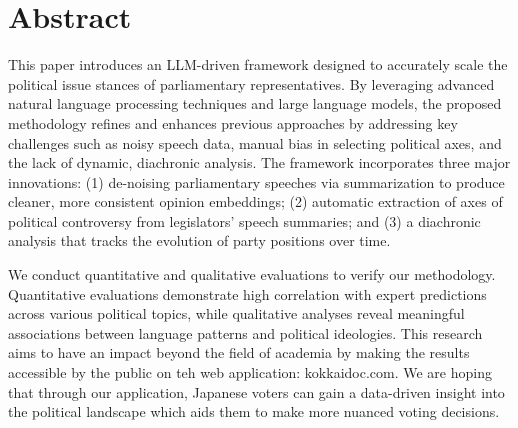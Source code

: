 \documentclass[final,5p,times,twocolumn,authoryear]{elsarticle}
\begin{document}






\onecolumn

\twocolumn
{}

\section{Abstract}
This paper introduces an LLM-driven framework designed to accurately scale the political issue stances of parliamentary representatives. By leveraging advanced natural language processing techniques and large language models, the proposed methodology refines and enhances previous approaches by addressing key challenges such as noisy speech data, manual bias in selecting political axes, and the lack of dynamic, diachronic analysis. The framework incorporates three major innovations: (1) de-noising parliamentary speeches via summarization to produce cleaner, more consistent opinion embeddings; (2) automatic extraction of axes of political controversy from legislators’ speech summaries; and (3) a diachronic analysis that tracks the evolution of party positions over time.

We conduct quantitative and qualitative evaluations to verify our methodology. Quantitative evaluations demonstrate high correlation with expert predictions across various political topics, while qualitative analyses reveal meaningful associations between language patterns and political ideologies. This research aims to have an impact beyond the field of academia by making the results accessible by the public on teh web application: kokkaidoc.com. We are hoping that through our application, Japanese voters can gain a data-driven insight into the political landscape which aids them to make more nuanced voting decisions. 
\end{document}
